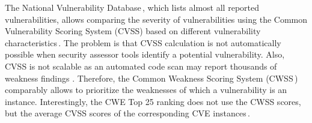 The National Vulnerability Database\,\cite{NVD2021}, which lists almost all reported vulnerabilities, allows comparing the severity of vulnerabilities using the Common Vulnerability Scoring System (CVSS) based on  different vulnerability characteristics\,\cite{CVSS2021}. %
The problem is that CVSS calculation is not automatically possible when security assessor tools identify a potential vulnerability. %
Also, CVSS is not scalable %
as an automated code scan may report thousands of weakness findings %
\cite{cwss}.
Therefore, the Common Weakness Scoring System (CWSS\,\cite{cwss}) comparably allows to prioritize the weaknesses of which a vulnerability is an instance.
Interestingly, the CWE Top 25 ranking does not use the CWSS scores, but the average CVSS scores of the corresponding CVE  instances\,\cite{mitre}.

